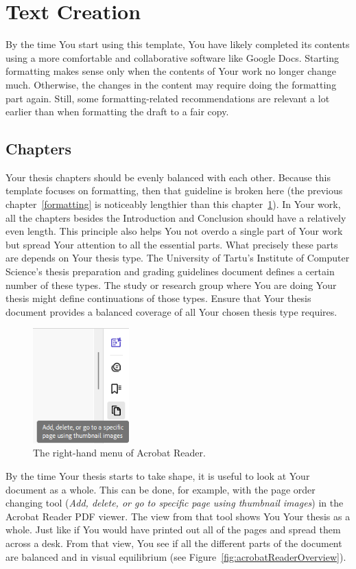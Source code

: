 \section{Text Creation} \label{textCreation}
By the time You start using this template, You have likely completed its contents using a more comfortable and collaborative software like Google Docs. Starting formatting makes sense only when the contents of Your work no longer change much. Otherwise, the changes in the content may require doing the formatting part again. Still, some formatting-related recommendations are relevant a lot earlier than when formatting the draft to a fair copy.

\subsection{Chapters}
Your thesis chapters should be evenly balanced with each other. Because this template focuses on formatting, then that guideline is broken here (the previous chapter~\ref{formatting} is noticeably lengthier than this chapter~\ref{textCreation}). In Your work, all the chapters besides the Introduction and Conclusion should have a relatively even length. This principle also helps You not overdo a single part of Your work but spread Your attention to all the essential parts. What precisely these parts are depends on Your thesis type. The University of Tartu’s Institute of Computer Science’s thesis preparation and grading guidelines document defines a certain number of these types. The study or research group where You are doing Your thesis might define continuations of those types. Ensure that Your thesis document provides a balanced coverage of all Your chosen thesis type requires.

\begin{figure}
    \centering
    \includegraphics[width=0.33\textwidth]{figures/Figure5-AcrobatReaderMenu.png}
    \caption{The right-hand menu of Acrobat Reader.}
    \label{fig:acrobatReaderMenu}
\end{figure}
By the time Your thesis starts to take shape, it is useful to look at Your document as a whole. This can be done, for example, with the page order changing tool (\emph{Add, delete, or go to specific page using thumbnail images}) in the Acrobat Reader PDF viewer. The view from that tool shows You Your thesis as a whole. Just like if You would have printed out all of the pages and spread them across a desk. From that view, You see if all the different parts of the document are balanced and in visual equilibrium (see Figure~\ref{fig:acrobatReaderOverview}).

